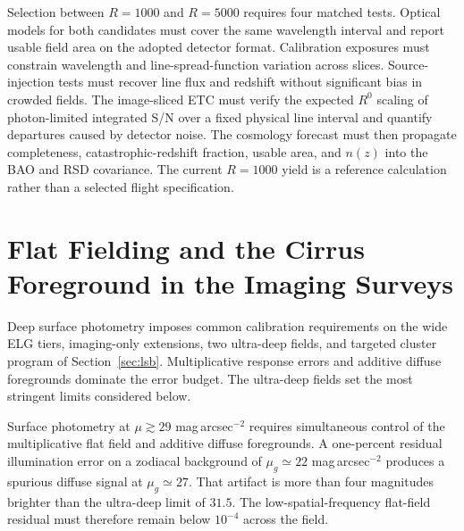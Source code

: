 Selection between $R=1000$ and $R=5000$ requires four matched tests. Optical models for both candidates must cover the same wavelength interval and report usable field area on the adopted detector format. Calibration exposures must constrain wavelength and line-spread-function variation across slices. Source-injection tests must recover line flux and redshift without significant bias in crowded fields. The image-sliced ETC must verify the expected $R^0$ scaling of photon-limited integrated S/N over a fixed physical line interval and quantify departures caused by detector noise. The cosmology forecast must then propagate completeness, catastrophic-redshift fraction, usable area, and $n(z)$ into the BAO and RSD covariance. The current $R=1000$ yield is a reference calculation rather than a selected flight specification.

\clearpage
\section{Flat Fielding and the Cirrus Foreground in the Imaging Surveys}\label{sec:flatcirrus}

Deep surface photometry imposes common calibration requirements on the wide ELG tiers, imaging-only extensions, two ultra-deep fields, and targeted cluster program of Section~\ref{sec:lsb}. Multiplicative response errors and additive diffuse foregrounds dominate the error budget. The ultra-deep fields set the most stringent limits considered below.

Surface photometry at $\mu\gtrsim29$ mag\,arcsec$^{-2}$ requires simultaneous control of the multiplicative flat field and additive diffuse foregrounds. A one-percent residual illumination error on a zodiacal background of $\mu_g\simeq22$ mag\,arcsec$^{-2}$ produces a spurious diffuse signal at $\mu_g\simeq27$. That artifact is more than four magnitudes brighter than the ultra-deep limit of $31.5$. The low-spatial-frequency flat-field residual must therefore remain below $10^{-4}$ across the field.

